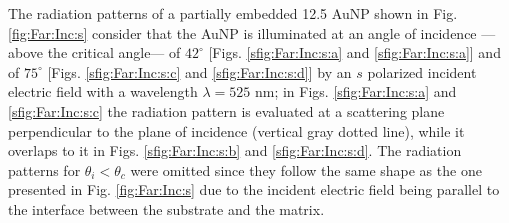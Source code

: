 The radiation patterns of a partially embedded 12.5 AuNP shown in Fig. \ref{fig:Far:Inc:s} consider that the AuNP is illuminated at an angle of incidence ---above the critical angle--- of $42^\circ$ [Figs. \ref{sfig:Far:Inc:s:a} and \ref{sfig:Far:Inc:s:a}] and of $75^\circ$ [Figs. \ref{sfig:Far:Inc:s:c} and \ref{sfig:Far:Inc:s:d}] by an $s$ polarized incident electric field with a wavelength $\lambda = 525$ nm; in Figs. \ref{sfig:Far:Inc:s:a} and   \ref{sfig:Far:Inc:s:c} the radiation pattern is evaluated at a scattering plane perpendicular to the plane of incidence (vertical gray dotted line), while it overlaps to it in  Figs. \ref{sfig:Far:Inc:s:b} and   \ref{sfig:Far:Inc:s:d}. The radiation patterns for $\theta_i<\theta_c$ were omitted since they follow the same shape as the one presented in Fig. \ref{fig:Far:Inc:s} due to the incident electric field being parallel to the interface between the substrate and the matrix.

